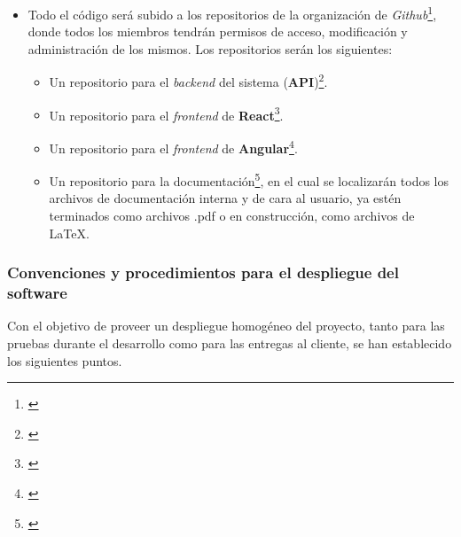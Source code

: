 \documentclass[11pt, a4paper, titlepage]{article}
\begin{document}
\begin{itemize}
    \item Todo el código será subido a los repositorios de la organización de \textit{Github}\footnote{\href{https://github.com/UNIZAR-30226-2022-01}{}}, donde todos los miembros tendrán permisos de acceso, modificación y administración de los mismos. Los repositorios serán los siguientes:
    \begin{itemize}
        \item Un repositorio para el \textit{backend} del sistema (\textbf{API})\footnote{\href{https://github.com/UNIZAR-30226-2022-01/proyecto_software_backend}{}}.

        \item Un repositorio para el \textit{frontend} de \textbf{React}\footnote{\href{https://github.com/UNIZAR-30226-2022-01/proyecto_software_frontend_react}{}}.

        \item Un repositorio para el \textit{frontend} de \textbf{Angular}\footnote{\href{https://github.com/UNIZAR-30226-2022-01/proyecto_software_frontend_angular}{}}.

        \item Un repositorio para la documentación\footnote{\href{https://github.com/UNIZAR-30226-2022-01/proyecto_software_documentacion}{\color{blue}{Repositorio de documentación}}}, en el cual se localizarán todos los archivos de documentación interna y de cara al usuario, ya estén terminados como archivos .pdf o en construcción, como archivos de \LaTeX.
    \end{itemize}




\end{itemize}

\subsubsection{Convenciones y procedimientos para el despliegue del software}

Con el objetivo de proveer un despliegue homogéneo del proyecto, tanto para las pruebas durante el desarrollo como para las entregas al cliente, se han establecido los siguientes puntos.
\end{document}
